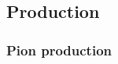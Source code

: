 \subsection{Production} %
\label{sub:production}
\subsubsection{Pion production} %
\label{ssub:pion_production}

